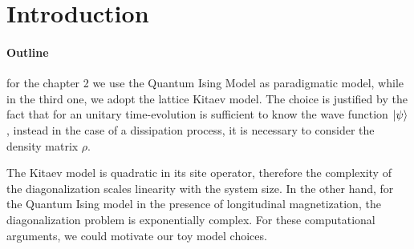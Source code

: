 \chapter{Introduction}









\subsubsection{Outline}


for the chapter 2 we use the Quantum Ising Model as paradigmatic model, while in the third
one, we adopt the lattice Kitaev model. The choice is justified by the fact that for an 
unitary time-evolution is sufficient to know the wave function $\ket \psi$, instead in 
the case of a dissipation process, it is necessary to consider the density matrix $\rho$.

The Kitaev model is quadratic in its site operator, therefore the complexity of the 
diagonalization scales linearity with the system size. In the other hand, for the 
Quantum Ising model in the presence of longitudinal magnetization, the diagonalization
problem is exponentially complex. For these computational arguments, we could motivate
our toy model choices.
